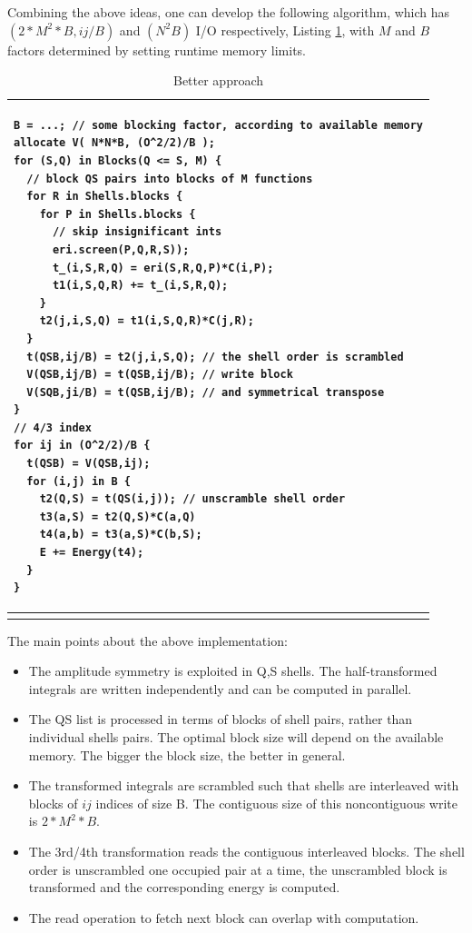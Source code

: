 \documentclass[12pt]{article} \usepackage[margin=1in]{geometry}
\newenvironment{listing}%
               {\begin{table}
                   \begin{tabular}{ p{6in} }
                     \hline}%
               {\end{tabular}%
               \end{table}}
\begin{document}
Combining the above ideas, one can develop the following
algorithm, which has $(2*M^2*B,ij/B)$ and $(N^2B)$ I/O respectively,
Listing \ref{better}, with $M$ and $B$ factors determined by setting
runtime memory limits.



\begin{listing}
\begin{verbatim}
B = ...; // some blocking factor, according to available memory
allocate V( N*N*B, (O^2/2)/B );
for (S,Q) in Blocks(Q <= S, M) {
  // block QS pairs into blocks of M functions 
  for R in Shells.blocks {
    for P in Shells.blocks {
      // skip insignificant ints
      eri.screen(P,Q,R,S));
      t_(i,S,R,Q) = eri(S,R,Q,P)*C(i,P);
      t1(i,S,Q,R) += t_(i,S,R,Q);
    }      
    t2(j,i,S,Q) = t1(i,S,Q,R)*C(j,R);
  }
  t(QSB,ij/B) = t2(j,i,S,Q); // the shell order is scrambled
  V(QSB,ij/B) = t(QSB,ij/B); // write block
  V(SQB,ji/B) = t(QSB,ij/B); // and symmetrical transpose
}
// 4/3 index
for ij in (O^2/2)/B {
  t(QSB) = V(QSB,ij);
  for (i,j) in B {
    t2(Q,S) = t(QS(i,j)); // unscramble shell order
    t3(a,S) = t2(Q,S)*C(a,Q)
    t4(a,b) = t3(a,S)*C(b,S);
    E += Energy(t4);
  }
}
\end{verbatim} \\
\hline
\caption{Better approach}
\label{better}
\end {listing}



The main points about the above implementation:
\begin{itemize}
\item The amplitude symmetry is exploited in Q,S shells.  The
  half-transformed integrals are written independently and can
  be computed in parallel.
\item The QS list is processed in terms of blocks of shell pairs,
  rather than individual shells pairs.  The optimal block size will
  depend on the available memory.  The bigger the block size, the
  better in general.
\item The transformed integrals are scrambled such that shells are
  interleaved with blocks of $ij$ indices of size B.  The contiguous
  size of this noncontiguous write is $2*M^2*B$.
\item The 3rd/4th transformation reads the contiguous interleaved
  blocks.  The shell order is unscrambled one occupied pair at a time,
  the unscrambled block is transformed and the corresponding energy is
  computed.
\item The read operation to fetch next block can overlap with computation.  
\end{itemize}
\end{document}
